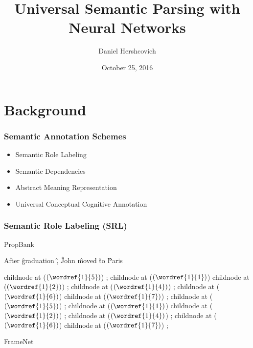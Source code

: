 \documentclass[t]{beamer}
\begin{document}
\title[]{Universal Semantic Parsing with Neural Networks}
\author{Daniel Hershcovich}
\date{October 25, 2016}

\begin{frame}
\titlepage
\end{frame}


\section{Background}

\begin{frame}
\frametitle{Semantic Annotation Schemes}
\begin{itemize}
 \item Semantic Role Labeling
 \item Semantic Dependencies
 \item Abstract Meaning Representation
 \item Universal Conceptual Cognitive Annotation
\end{itemize}
\end{frame}

\begin{frame}
\frametitle{Semantic Role Labeling (SRL)}
\centering
\vspace*{\fill}
PropBank
\vspace*{\fill}

\begin{dependency}
	\begin{deptext}[column sep=1.5em,ampersand replacement=\^]
	After \^ graduation \^ , \^ John \^ moved \^ to \^ Paris \\
	\end{deptext}
	child{node at ($(\wordref{1}{5})$) {}};
	child{node at ($(\wordref{1}{1})$) {}}
	child{node at ($(\wordref{1}{2})$) {}};
	child{node at ($(\wordref{1}{4})$) {}};
	child{node at ($(\wordref{1}{6})$) {}}
	child{node at ($(\wordref{1}{7})$) {}};
	child{node at ($(\wordref{1}{5})$) {}};
	child{node at ($(\wordref{1}{1})$) {}}
	child{node at ($(\wordref{1}{2})$) {}};
	child{node at ($(\wordref{1}{4})$) {}};
	child{node at ($(\wordref{1}{6})$) {}}
	child{node at ($(\wordref{1}{7})$) {}};
\end{dependency}

\vspace*{\fill}
FrameNet
\end{frame}
\end{document}
